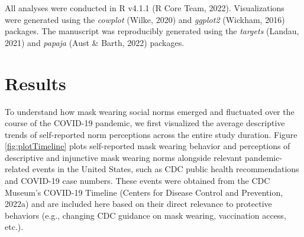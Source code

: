 \documentclass[
  english,
  man,floatsintext]{apa6}
\begin{document}
All analyses were conducted in R v4.1.1 (R Core Team, 2022). Visualizations were generated using the \emph{cowplot} (Wilke, 2020) and \emph{ggplot2} (Wickham, 2016) packages. The manuscript was reproducibly generated using the \emph{targets} (Landau, 2021) and \emph{papaja} (Aust \& Barth, 2022) packages.

\hypertarget{results}{%
\section{Results}\label{results}}

To understand how mask wearing social norms emerged and fluctuated over the course of the COVID-19 pandemic, we first visualized the average descriptive trends of self-reported norm perceptions across the entire study duration. Figure \ref{fig:plotTimeline} plots self-reported mask wearing behavior and perceptions of descriptive and injunctive mask wearing norms alongside relevant pandemic-related events in the United States, such as CDC public health recommendations and COVID-19 case numbers. These events were obtained from the CDC Museum's COVID-19 Timeline (Centers for Disease Control and Prevention, 2022a) and are included here based on their direct relevance to protective behaviors (e.g., changing CDC guidance on mask wearing, vaccination access, etc.).
\end{document}
